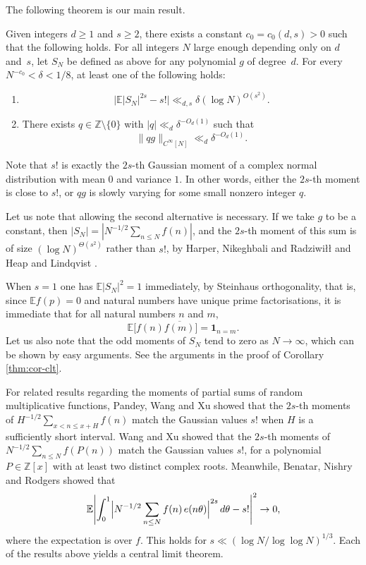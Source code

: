 The following theorem is our main result.
\begin{theorem}\label{thm:main}
Given integers $d \geq 1$ and $s\geq 2$, there exists a constant $c_0=c_0(d,s)>0$ such that the following holds.
For all integers $N$ large enough depending only on $d$ and~$s$, let $S_N$ be defined as above for any polynomial $g$ of degree~$d$.
For every $N^{-c_0}<\delta<1/8$, at least one of the following holds:
\begin{enumerate}
    \item \[
    \Big|\mathbb{E}\big|S_N\big|^{2s}-s!\Big|
    \ll_{d,s} \delta(\log N)^{O(s^2)}.
    \]
    \item There exists $q\in\mathbb{Z}\setminus\{0\}$ with $|q|\ll_d\delta^{-O_d(1)}$ such that
    \[
    \|qg\|_{C^{\infty}[N]}\ll_d\delta^{-O_d(1)}.
    \]
    \end{enumerate}
\end{theorem}
Note that $s!$ is exactly the $2s$-th Gaussian moment of a complex normal distribution with mean $0$ and variance $1$.
In other words, either the $2s$-th moment is close to $s!$, or $qg$ is slowly varying for some small nonzero integer $q$.

Let us note that allowing the second alternative is necessary.
If we take $g$ to be a constant, then
$|S_N|=|N^{-1/2}\sum_{n\le N}f(n)|$, and the $2s$-th moment of this sum
is of size $(\log N)^{\Theta(s^2)}$ rather than $s!$, by Harper,
Nikeghbali and Radziwi{\l}{\l} \cite{HNR15} and Heap and Lindqvist
\cite{HeapLindqvist16}. 

When $s=1$ one has $\mathbb{E}|S_N|^2=1$ immediately, by Steinhaus orthogonality, that is,
since $\mathbb{E} f(p)=0$ and natural numbers have unique prime factorisations, it is immediate that for all natural numbers $n$ and $m$,
\[
\mathbb{E}\bigl[f(n)\overline{f(m)}\bigr]=\mathbf{1}_{n=m}.
\]
Let us also note that the odd moments of $S_N$ tend to zero as $N\to\infty$, which can be 
shown by easy arguments. See the arguments in the proof of Corollary \ref{thm:cor-clt}.





For related results regarding the moments of partial sums of random multiplicative functions, Pandey, Wang and Xu \cite{PWX24} showed
that the $2s$-th moments of $H^{-1/2}\sum_{x<n\le x+H}f(n)$ match the Gaussian
values $s!$ when $H$ is a sufficiently short interval.  Wang and Xu
\cite{WX24} showed that the $2s$-th moments of
$N^{-1/2}\sum_{n\le N}f(P(n))$ match the Gaussian values $s!$, for a
polynomial $P\in\mathbb{Z}[x]$ with at least two distinct complex roots.
Meanwhile, Benatar, Nishry and Rodgers \cite{BNR} showed that
\[
\mathbb{E}\Biggl|\int_0^1\Bigl|N^{-1/2}\sum_{n\le N}f(n)\,e(n\theta)\Bigr|^{2s}\,d\theta-s!\Biggr|^2\to 0,
\]
where the expectation is over \(f\).
This holds for $s\ll(\log N/\log\log N)^{1/3}$.
Each of the results above yields a central limit theorem.

